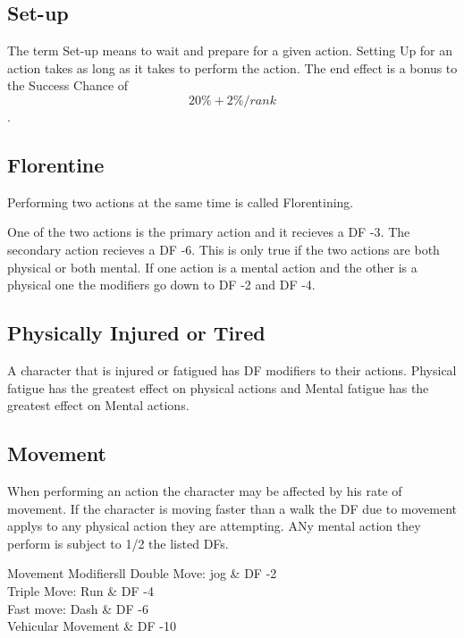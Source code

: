 \subsection{Set-up}

The term Set-up means to wait and prepare for a given action. Setting Up for
an action takes as long as it takes to perform the action. The end effect is a
bonus to the Success Chance of \[ 20\% + 2\%/rank\]. 

\subsection{Florentine}

Performing two actions at the same time is called Florentining.

One of the two actions is the primary action and it recieves a 
DF -3. The secondary action recieves a DF -6. This is only true 
if the two actions are both physical or both mental. If one 
action is a mental action and the other is a physical one the modifiers
go down to DF -2 and DF -4.



\subsection{Physically Injured or Tired}

A character that is injured or fatigued has DF modifiers to 
their actions. Physical fatigue has the greatest effect on physical actions 
and Mental fatigue has the greatest effect on Mental actions.




\subsection{Movement} 

When performing an action the character may be affected by 
his rate of movement. If the character is moving faster than a 
walk the DF due to movement applys to any physical action they are 
attempting. ANy mental action they perform is subject to 1/2 
the listed DFs.

\begin{stable}{Movement Modifiers}{ll}
	Double Move: jog							  & DF -2 \\
	Triple Move: Run							  & DF -4 \\
	Fast move: Dash							 & DF -6\\
	Vehicular Movement							& DF -10 \\ 
\end{stable}

